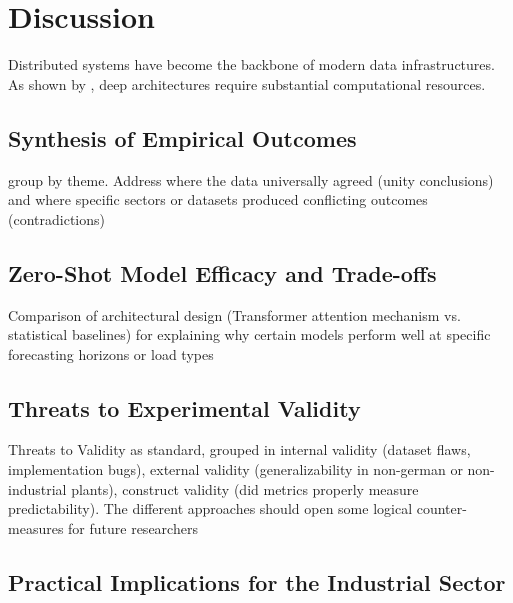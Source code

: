 \chapter{Discussion}
\label{chap:discussion}

Distributed systems have become the backbone of modern data infrastructures. As shown by \textcite{vaswani2017attention}, deep architectures require substantial computational resources.


\section{Synthesis of Empirical Outcomes}
\label{sec:synthesisOutcomes}

group by theme. Address where the data universally agreed (unity conclusions) and where specific sectors or datasets produced conflicting outcomes (contradictions)


\section{Zero-Shot Model Efficacy and Trade-offs}
\label{sec:modelEfficacy}

Comparison of architectural design (Transformer attention mechanism vs. statistical baselines) for explaining why certain models perform well at specific forecasting horizons or load types



\section{Threats to Experimental Validity}
\label{sec:validityThreats}

Threats to Validity as standard, grouped in internal validity (dataset flaws, implementation bugs), external validity (generalizability in non-german or non-industrial plants), construct validity (did metrics properly measure predictability). The different approaches should open some logical counter-measures for future researchers


\section{Practical Implications for the Industrial Sector}
\label{sec:practicalImplications}
